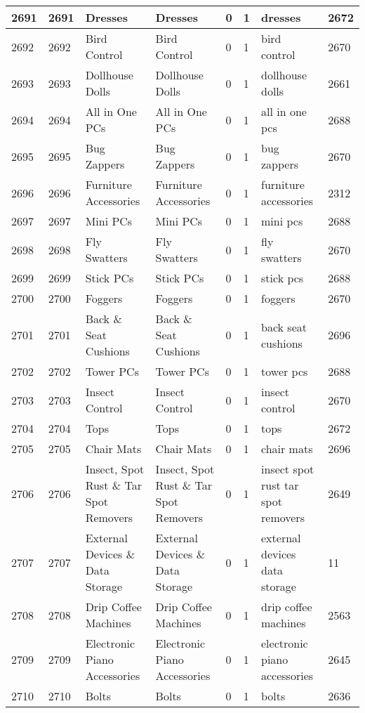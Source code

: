 \begin{longtable}{|l|l|l|l|l|l|l|l|}
2691 & 2691 & Dresses & Dresses & 0 & 1 & dresses & 2672 \\ \hline 
2692 & 2692 & Bird Control & Bird Control & 0 & 1 & bird control & 2670 \\ \hline 
2693 & 2693 & Dollhouse Dolls & Dollhouse Dolls & 0 & 1 & dollhouse dolls & 2661 \\ \hline 
2694 & 2694 & All in One PCs & All in One PCs & 0 & 1 & all in one pcs & 2688 \\ \hline 
2695 & 2695 & Bug Zappers & Bug Zappers & 0 & 1 & bug zappers & 2670 \\ \hline 
2696 & 2696 & Furniture Accessories & Furniture Accessories & 0 & 1 & furniture accessories & 2312 \\ \hline 
2697 & 2697 & Mini PCs & Mini PCs & 0 & 1 & mini pcs & 2688 \\ \hline 
2698 & 2698 & Fly Swatters & Fly Swatters & 0 & 1 & fly swatters & 2670 \\ \hline 
2699 & 2699 & Stick PCs & Stick PCs & 0 & 1 & stick pcs & 2688 \\ \hline 
2700 & 2700 & Foggers & Foggers & 0 & 1 & foggers & 2670 \\ \hline 
2701 & 2701 & Back \& Seat Cushions & Back \& Seat Cushions & 0 & 1 & back seat cushions & 2696 \\ \hline 
2702 & 2702 & Tower PCs & Tower PCs & 0 & 1 & tower pcs & 2688 \\ \hline 
2703 & 2703 & Insect Control & Insect Control & 0 & 1 & insect control & 2670 \\ \hline 
2704 & 2704 & Tops & Tops & 0 & 1 & tops & 2672 \\ \hline 
2705 & 2705 & Chair Mats & Chair Mats & 0 & 1 & chair mats & 2696 \\ \hline 
2706 & 2706 & Insect, Spot Rust \& Tar Spot Removers & Insect, Spot Rust \& Tar Spot Removers & 0 & 1 & insect spot rust tar spot removers & 2649 \\ \hline 
2707 & 2707 & External Devices \& Data Storage & External Devices \& Data Storage & 0 & 1 & external devices data storage & 11 \\ \hline 
2708 & 2708 & Drip Coffee Machines & Drip Coffee Machines & 0 & 1 & drip coffee machines & 2563 \\ \hline 
2709 & 2709 & Electronic Piano Accessories & Electronic Piano Accessories & 0 & 1 & electronic piano accessories & 2645 \\ \hline 
2710 & 2710 & Bolts & Bolts & 0 & 1 & bolts & 2636 \\ \hline 

\end{longtable}
